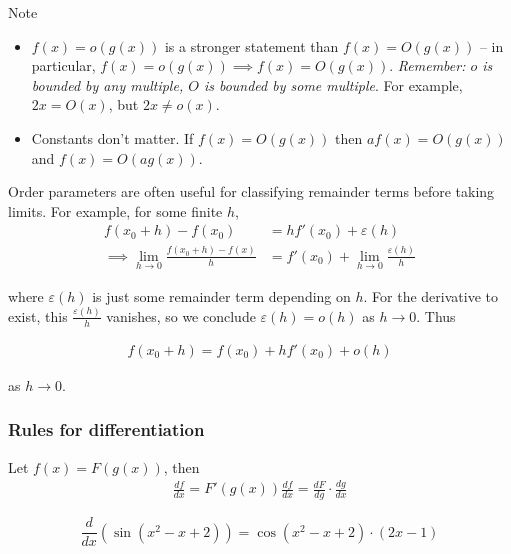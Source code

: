 \documentclass{../template/note}
\begin{document}
    \begin{remark*} Note
        \begin{itemize}
            \item \(f(x) = o(g(x))\) is a stronger statement than \(f(x) = O(g(x))\) -- in particular, \(f(x) = o(g(x)) \implies f(x) = O(g(x))\). \emph{Remember: \(o\) is bounded by any multiple, \(O\) is bounded by some multiple}. For example, \(2x = O(x)\), but \(2x \neq o(x)\).
            \item Constants don't matter. If \(f(x) = O(g(x))\) then \(af(x) = O(g(x))\) and \(f(x) = O(ag(x))\).
        \end{itemize}
    \end{remark*}
    
    \noindent Order parameters are often useful for classifying remainder terms before taking limits. For example, for some finite \(h\),
    \begin{align*}
        f(x_0+h) - f(x_0) &= hf'(x_0) + \varepsilon(h) \\
        \implies \lim_{h \to 0}\frac{f(x_0+h)-f(x)}{h} &= f'(x_0) + \lim_{h \to 0} \frac{\varepsilon(h)}{h}
    \end{align*}

    where \(\varepsilon(h)\) is just some remainder term depending on \(h\). For the derivative to exist, this \(\frac{\varepsilon(h)}{h}\) vanishes, so we conclude \(\varepsilon(h) = o(h)\) as \(h \to 0\). Thus

    \begin{align*}
        f(x_0 + h) = f(x_0) + hf'(x_0) + o(h)
    \end{align*}
    
    as \(h \to 0\).


    \subsubsection{Rules for differentiation}

    \begin{theorem}
        Let \(f(x) = F(g(x))\), then
        \begin{align*}
            \frac{df}{dx} = F'(g(x))\frac{df}{dx} = \frac{dF}{dg}\cdot\frac{dg}{dx}
        \end{align*}
        
        
    \end{theorem}

    \begin{example}
        \[
            \frac{d}{dx}\left(\sin(x^2-x+2)\right) = \cos(x^2-x+2) \cdot (2x-1)
        \]
        
        
    \end{example}
    
\end{document}
